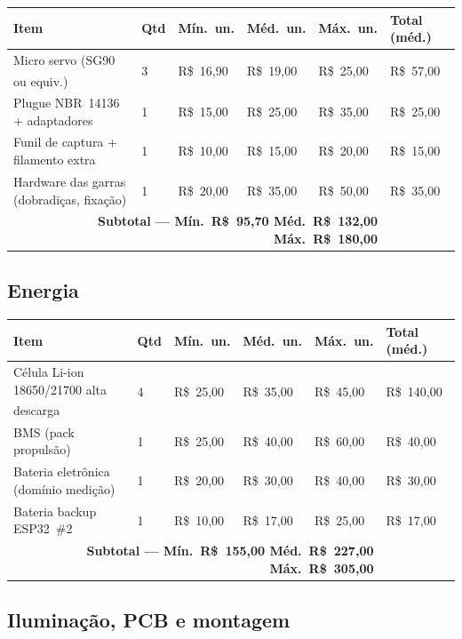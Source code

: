 \documentclass[11pt,a4paper]{article}
\newcommand{\pesq}{\textsuperscript{\textdagger}}
\begin{document}
\begin{longtable}{@{}p{5.4cm}p{0.9cm}p{1.7cm}p{1.7cm}p{1.7cm}p{2.1cm}@{}}
\toprule
\textbf{Item} & \textbf{Qtd} & \textbf{Mín.\ un.} & \textbf{Méd.\ un.} & \textbf{Máx.\ un.} & \textbf{Total (méd.)} \\
\midrule
\endhead
\bottomrule
\endfoot
Micro servo (SG90 ou equiv.)\pesq & 3 & R\$~16,90 & R\$~19,00 & R\$~25,00 & R\$~57,00 \\
Plugue NBR~14136 + adaptadores & 1 & R\$~15,00 & R\$~25,00 & R\$~35,00 & R\$~25,00 \\
Funil de captura + filamento extra & 1 & R\$~10,00 & R\$~15,00 & R\$~20,00 & R\$~15,00 \\
Hardware das garras (dobradiças, fixação) & 1 & R\$~20,00 & R\$~35,00 & R\$~50,00 & R\$~35,00 \\
\midrule
\multicolumn{5}{r}{\textbf{Subtotal — Mín.\ R\$~95,70 \quad Méd.\ R\$~132,00 \quad Máx.\ R\$~180,00}} & \\
\end{longtable}

\subsection{Energia}

\begin{longtable}{@{}p{5.4cm}p{0.9cm}p{1.7cm}p{1.7cm}p{1.7cm}p{2.1cm}@{}}
\toprule
\textbf{Item} & \textbf{Qtd} & \textbf{Mín.\ un.} & \textbf{Méd.\ un.} & \textbf{Máx.\ un.} & \textbf{Total (méd.)} \\
\midrule
\endhead
\bottomrule
\endfoot
Célula Li-ion 18650/21700 alta descarga\pesq & 4 & R\$~25,00 & R\$~35,00 & R\$~45,00 & R\$~140,00 \\
BMS (pack propulsão) & 1 & R\$~25,00 & R\$~40,00 & R\$~60,00 & R\$~40,00 \\
Bateria eletrônica (domínio medição) & 1 & R\$~20,00 & R\$~30,00 & R\$~40,00 & R\$~30,00 \\
Bateria backup ESP32~\#2 & 1 & R\$~10,00 & R\$~17,00 & R\$~25,00 & R\$~17,00 \\
\midrule
\multicolumn{5}{r}{\textbf{Subtotal — Mín.\ R\$~155,00 \quad Méd.\ R\$~227,00 \quad Máx.\ R\$~305,00}} & \\
\end{longtable}

\subsection{Iluminação, PCB e montagem}
\end{document}
